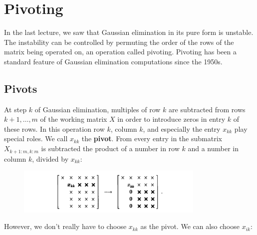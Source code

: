 \chapter{Pivoting}

In the last lecture, we saw that Gaussian elimination in its pure form is unstable. The instability can be controlled by permuting the order of the rows of the matrix being operated on, an operation called pivoting. Pivoting has been a standard feature of Gaussian elimination computations since the 1950s. 

\section{Pivots}
At step $k$ of Gaussian elimination, multiples of row $k$ are subtracted from rows $k+1, \ldots, m$ of the working matrix $X$ in order to introduce zeros in entry $k$ of these rows. In this operation row $k$, column $k$, and especially the entry $x_{k k}$ play special roles. We call $x_{k k}$ the \textbf{pivot}. From every entry in the submatrix $X_{k+1: m, k: m}$ is subtracted the product of a number in row $k$ and a number in column $k$, divided by $x_{k k}$:
\begin{figure}[H]
    \centering
    \includegraphics[width=0.8\textwidth]{figures/21-1.png}
\end{figure}
However, we don't really have to choose $x_{kk}$ as the pivot. We can also choose $x_{ik}$: 

